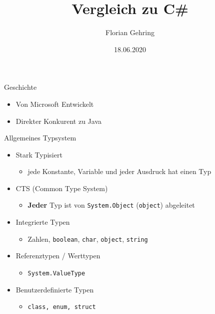 \documentclass[11pt]{beamer}
\author{Florian Gehring}
\title{Vergleich zu C\#}
\date{18.06.2020}
\begin{document}
\setlength{\columnseprule}{0.4pt}

\begin{frame}
\titlepage
\end{frame}


\begin{frame}{Geschichte}
\begin{itemize}
	\item Von Microsoft Entwickelt
	\item \glqq Direkter Konkurent\grqq{} zu Java
\end{itemize}
\end{frame}


\begin{frame}{Allgemeines Typsystem}
\begin{itemize}
\item Stark Typisiert
\begin{itemize}
	\item jede Konstante, Variable und jeder Ausdruck hat einen Typ
\end{itemize}
\item CTS (Common Type System)
\begin{itemize}
	\item \textbf{Jeder} Typ ist von \texttt{System.Object} (\texttt{object}) abgeleitet
\end{itemize}
\item Integrierte Typen
\begin{itemize}
	\item \glqq Zahlen\grqq{}, \texttt{boolean}, \texttt{char}, \texttt{object}, \texttt{string}
\end{itemize}
\item Referenztypen / Werttypen
\begin{itemize}
\item \texttt{System.ValueType}
\end{itemize}
\item Benutzerdefinierte Typen
\begin{itemize}
\item \texttt{class, enum, struct}
\end{itemize}
\end{itemize}
\end{frame}
\end{document}
